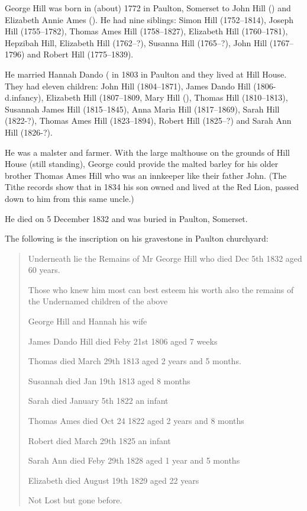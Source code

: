 
George Hill was born in (about) 1772 in	Paulton, Somerset to John Hill () and Elizabeth Annie Ames ().  He had nine siblings: Simon Hill (1752--1814), Joseph Hill (1755--1782), Thomas Ames Hill (1758--1827), Elizabeth Hill (1760--1781), Hepzibah Hill, Elizabeth Hill (1762--?), Susanna Hill (1765--?),
John Hill (1767--1796) and Robert Hill (1775--1839). 

He married Hannah Dando ( in 1803 in Paulton and they lived at Hill House. They had eleven children: 
John Hill (1804--1871), James Dando Hill (1806-d.infancy), Elizabeth Hill (1807--1809, Mary Hill (),
Thomas Hill (1810--1813), Susannah James Hill (1815--1845), Anna Maria Hill (1817--1869), Sarah Hill (1822-?),
Thomas Ames Hill (1823--1894), Robert Hill (1825--?) and Sarah Ann Hill (1826-?).

He was a malster and farmer. With the large malthouse on the grounds of Hill House (still standing), George could provide the malted barley for his older brother Thomas Ames Hill who was an innkeeper like their father John. (The Tithe records show that in 1834 his son owned and lived at the Red Lion, passed down to him from this same uncle.)

He died on 5 December 1832 and was buried in Paulton, Somerset.

The following is the inscription on his gravestone in Paulton churchyard:

\begin{quotation}
Underneath lie the Remains of Mr George Hill who died Dec 5th 1832 aged 60 years.

Those who knew him most can best esteem his worth also the remains of the Undernamed children of the above

George Hill and Hannah his wife

James Dando Hill died Feby 21st 1806 aged 7 weeks

Thomas died March 29th 1813 aged 2 years and 5 months.

Susannah died Jan 19th 1813 aged 8 months

Sarah died January 5th 1822 an infant

Thomas Ames died Oct 24 1822 aged 2 years and 8 months

Robert died March 29th 1825 an infant

Sarah Ann died Feby 29th 1828 aged 1 year and 5 months

Elizabeth died August 19th 1829 aged 22 years

Not Lost but gone before.
\end{quotation}

